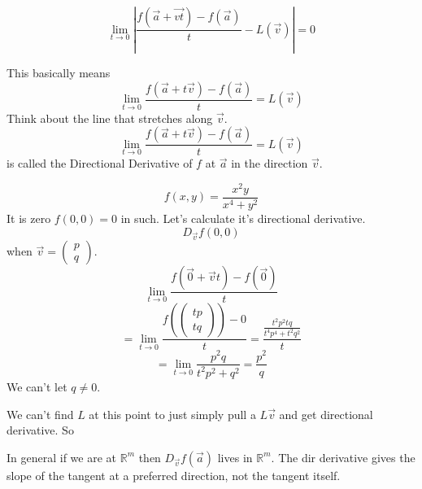 \documentclass[letter]{article}
\begin{document}
\[
\lim_{t \to 0} | 
\frac{f(\vec{a}+\vec{vt}) - f(\vec{a}) }{t} 
- L(\vec{v})
| = 0
\]

This basically means 
\[
\lim_{t \to 0} \frac{f(\vec{a} + t \vec{v}) - f(\vec{a})}{t} = L(\vec{v})
\]
Think about the line that stretches along $\vec{v}$. 
\[
\lim_{t \to 0} \frac{f(\vec{a} + t \vec{v}) - f(\vec{a})}{t} = L(\vec{v})
\]
is called the Directional Derivative of $f$ at $\vec{a}$ in the direction $\vec{v}$. 

\[
f(x,y) = \frac{x^2y}{x^4 + y^2}
\] It is zero $f(0,0) = 0$ in such. 
Let's calculate it's directional derivative. 
\[
	D_{\vec{v}} f(0,0)
\] when $\vec{v} = \begin{pmatrix} p \\ q \end{pmatrix} $.
\[
	\lim_{t \to 0}  \frac{f(\vec{0} + \vec{v}t ) - f(\vec{0})}{t}
\]
\[
= \lim_{t \to 0} \frac{f(\begin{pmatrix} tp\\tq \end{pmatrix} ) - 0}{t} = \frac{\frac{t^2 p^2 t q}{t ^{4} p^{4} + t^2 q^2}}{t}
\]
\[
= \lim_{t \to 0} \frac{p^2 q}{t^2 p^2 + q^2} = \frac{p^2}{q}
\]
We can't let $q\neq 0$. 

We can't find $L$ at this point to just simply pull a $L \vec{v}$ and get directional derivative. So 

In general if we are at $\mathbb{R}^{m}$ then $D_{\vec{v}} f(\vec{a})$ lives in $\mathbb{R}^{m}$. The dir derivative gives the slope of the tangent at a preferred direction, not the tangent itself. 
\end{document}
